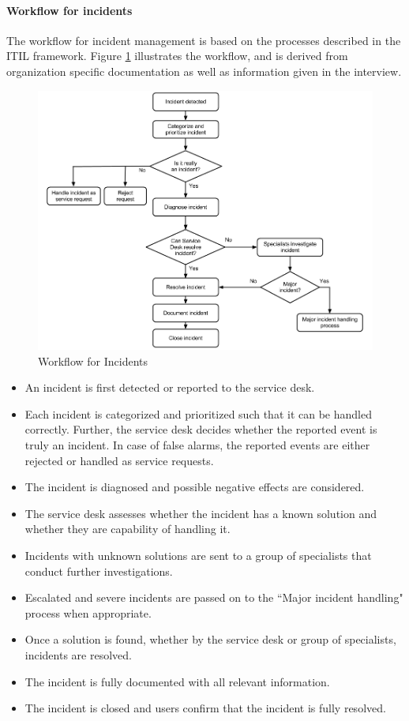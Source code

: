 \paragraph{Workflow for incidents}
The workflow for incident management is based on the processes described in the ITIL framework. Figure \ref{fig:workflowcaseC} illustrates the workflow, and is derived from organization specific documentation as well as information given in the interview. 

\begin{figure}[H]
\hspace{-1.1cm}\includegraphics[scale=0.49]{workflowcaseC.png}
\caption[Workflow for Incidents, Case C]{Workflow for Incidents}
\label{fig:workflowcaseC}
\end{figure}

\begin{itemize}
\item An incident is first detected or reported to the service desk.
\item Each incident is categorized and prioritized such that it can be handled correctly. Further, the service desk decides whether the reported event is truly an incident. In case of false alarms, the reported events are either rejected or handled as service requests.
\item The incident is diagnosed and possible negative effects are considered.
\item The service desk assesses whether the incident has a known solution and whether they are capability of handling it.
\item Incidents with unknown solutions are sent to a group of specialists that conduct further investigations.
\item Escalated and severe incidents are passed on to the ``Major incident handling" process when appropriate. 
\item Once a solution is found, whether by the service desk or group of specialists, incidents are resolved.
\item The incident is fully documented with all relevant information.
\item The incident is closed and users confirm that the incident is fully resolved. 
\end{itemize}

